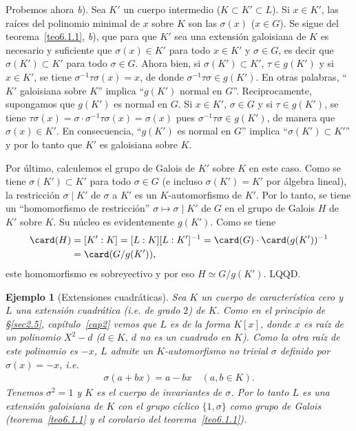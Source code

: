 \documentclass[bibtotoc,leqno,spanish]{amsbook}
\newcommand{\QED}{LQQD.}
\numberwithin{equation}{section}
\theoremstyle{note}
\theoremstyle{note}
\theoremstyle{rem}
\newtheorem{example}{Ejemplo}
\numberwithin{theorem}{section}
\numberwithin{proposition}{section}
\numberwithin{definition}{section}
\numberwithin{lemma}{section}
\numberwithin{corollary}{section}
\numberwithin{example}{section}
\numberwithin{footnote}{section}%
\begin{document}
Probemos ahora {\itshape b}). Sea $K'$ un cuerpo intermedio ($K\subset K'\subset L$). Si $x\in K'$, las
ra\'ices del polinomio minimal de $x$ sobre $K$ son las $\sigma(x)$ ($x\in G$). Se sigue
del teorema~\ref{teo6.1.1}, {\itshape b}),
que para que $K'$ sea una extensi\'on galoisiana de $K$ es necesario y suficiente
que $\sigma(x)\in K'$
para todo $x\in K'$ y $\sigma\in G$, es decir que $\sigma(K')\subset K'$ para
todo $\sigma\in G$. Ahora bien,
si $\sigma(K')\subset K'$, $\tau\in g(K')$ y si $x\in K'$, se tiene
$\sigma^{-1}\tau\sigma(x) = x$, de donde
$\sigma^{-1}\tau\sigma\in g(K')$. En otras palabras, ``$K'$ galoisiana sobre $K$''
implica ``$g(K')$ normal
en $G$''. Reciprocamente, supongamos que $g(K')$ es normal en $G$. Si $x\in K'$,
$\sigma\in G$ y si
$\tau\in g(K')$, se tiene
$\tau\sigma(x) = \sigma\cdot\sigma^{-1}\tau\sigma(x) = \sigma(x)$ pues
$\sigma^{-1}\tau\sigma\in g(K')$, de manera que $\sigma(x) \in K'$.
En consecuencia, ``$g(K')$ es normal
en $G$'' implica ``$\sigma(K')\subset K'$'' y por lo tanto que $K'$ es galoisiana sobre $K$.

Por \'ultimo, calculemos el grupo de Galois de $K'$ sobre $K$ en este caso. Como se
tiene $\sigma(K')\subset K'$
para todo $\sigma\in G$ (e incluso $\sigma(K') = K'$ por \'algebra lineal), la restricci\'on
$\sigma\mid K'$ de $\sigma$ a $K'$ es un $K$-automorfismo de $K'$. Por lo tanto, se tiene un
``homomorfismo de restricci\'on'' $\sigma\mapsto\sigma\mid K'$ de $G$ en el grupo de
Galois $H$ de $K'$ sobre $K$.
Su n\'ucleo es evidentemente $g(K')$. Como se tiene
\begin{align*}
\card(H) &= [K':K]=[L:K][L:K']^{-1}=\card(G)\cdot\card(g(K'))^{-1}\\
&= \card(G/g(K')),
\end{align*}
este homomorfismo es sobreyectivo y por eso $H\simeq G/g(K')$. \QED

\begin{example}[Extensiones cuadr\'aticas]

Sea $K$ un cuerpo de caracter\'istica cero y $L$ una extensi\'on cuadr\'atica (i.e. de
grado $2$) de $K$.
Como en el principio de \S\ref{sec2.5}, cap\'itulo~\ref{cap2} vemos que $L$ es de la
forma $K[x]$, donde $x$ es
ra\'iz de un polinomio $X^{2}-d$ ($d\in K$, $d$ no es un cuadrado en $K$). Como la otra
ra\'iz de este polinomio
es $-x$, $L$ admite un $K$-automorfismo no trivial $\sigma$ definido por $\sigma(x) = -x$, i.e.
\begin{gather*}
\sigma(a+bx) = a-bx\quad(a,b\in K).
\end{gather*}
Tenemos $\sigma^{2}=1$ y $K$ es el cuerpo de invariantes de $\sigma$.
Por lo tanto $L$ es una extensi\'on
{\em galoisiana} de $K$ con el grupo {\em c\'iclico} $\{1,\sigma\}$ como grupo de
Galois (teorema~\ref{teo6.1.1} y el corolario del teorema~\ref{teo6.1.1}).
\end{example}
\end{document}
